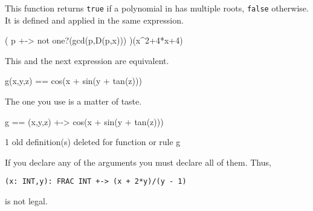 \begin{xtc}
\begin{xtccomment}
This function returns {\tt true} if a polynomial in  has multiple
roots, {\tt false} otherwise.
It is defined and applied in the same expression.
\end{xtccomment}
\begin{spadsrc}
( p +-> not one?(gcd(p,D(p,x))) )(x^2+4*x+4)
\end{spadsrc}
\begin{TeXOutput}
\begin{fricasmath}{7}
%
\end{fricasmath}
\end{TeXOutput}
\end{xtc}

\begin{xtc}
\begin{xtccomment}
This and the next expression are equivalent.
\end{xtccomment}
\begin{spadsrc}
g(x,y,z) == cos(x + sin(y + tan(z)))
\end{spadsrc}
\end{xtc}
\begin{xtc}
\begin{xtccomment}
The one you use is a matter of taste.
\end{xtccomment}
\begin{spadsrc}
g == (x,y,z) +-> cos(x + sin(y + tan(z)))
\end{spadsrc}
\begin{MessageOutput}
   1 old definition(s) deleted for function or rule g 
\end{MessageOutput}
\end{xtc}


If you declare any of the arguments you must declare all of them.
Thus,
\begin{verbatim}
(x: INT,y): FRAC INT +-> (x + 2*y)/(y - 1)
\end{verbatim}
is not legal.

